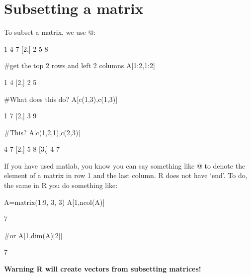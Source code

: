 \section{Subsetting a matrix}
To subset a matrix, we use \verb@[ ]@:
\begin{Schunk}
\begin{Soutput}
     [,1] [,2] [,3]
[1,]    1    4    7
[2,]    2    5    8
\end{Soutput}
\begin{Sinput}
 #get the top 2 rows and left 2 columns
 A[1:2,1:2]
\end{Sinput}
\begin{Soutput}
     [,1] [,2]
[1,]    1    4
[2,]    2    5
\end{Soutput}
\begin{Sinput}
 #What does this do?
 A[c(1,3),c(1,3)]
\end{Sinput}
\begin{Soutput}
     [,1] [,2]
[1,]    1    7
[2,]    3    9
\end{Soutput}
\begin{Sinput}
 #This?
 A[c(1,2,1),c(2,3)]
\end{Sinput}
\begin{Soutput}
     [,1] [,2]
[1,]    4    7
[2,]    5    8
[3,]    4    7
\end{Soutput}
\end{Schunk}
If you have used matlab, you know you can say something like \verb@A[1,end]@ to denote the element of a matrix in row 1 and the last column.  R does not have `end'.  To do, the same in R you do something like:
\begin{Schunk}
\begin{Sinput}
 A=matrix(1:9, 3, 3)
 A[1,ncol(A)]
\end{Sinput}
\begin{Soutput}
[1] 7
\end{Soutput}
\begin{Sinput}
 #or
 A[1,dim(A)[2]]
\end{Sinput}
\begin{Soutput}
[1] 7
\end{Soutput}
\end{Schunk}

\textbf{Warning R will create vectors from subsetting matrices!}

